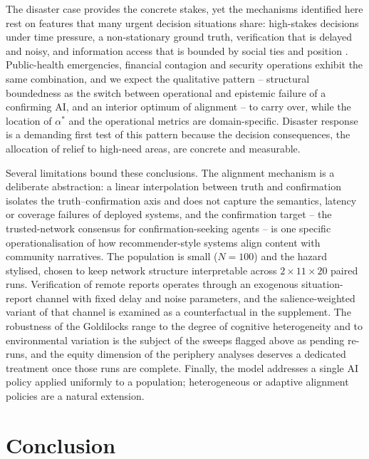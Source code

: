 \documentclass[pdflatex,sn-basic]{sn-jnl}
\begin{document}
The disaster case provides the concrete stakes, yet the mechanisms identified here rest on features that many urgent decision situations share: high-stakes decisions under time pressure, a non-stationary ground truth, verification that is delayed and noisy, and information access that is bounded by social ties and position \citep{svenson1993time,mendonca2001decision,holguin2012unique}. Public-health emergencies, financial contagion and security operations exhibit the same combination, and we expect the qualitative pattern -- structural boundedness as the switch between operational and epistemic failure of a confirming AI, and an interior optimum of alignment -- to carry over, while the location of $\alpha^{*}$ and the operational metrics are domain-specific. Disaster response is a demanding first test of this pattern because the decision consequences, the allocation of relief to high-need areas, are concrete and measurable.

Several limitations bound these conclusions. The alignment mechanism is a deliberate abstraction: a linear interpolation between truth and confirmation isolates the truth--confirmation axis and does not capture the semantics, latency or coverage failures of deployed systems, and the confirmation target -- the trusted-network consensus for confirmation-seeking agents -- is one specific operationalisation of how recommender-style systems align content with community narratives. The population is small ($N = 100$) and the hazard stylised, chosen to keep network structure interpretable across $2 \times 11 \times 20$ paired runs. Verification of remote reports operates through an exogenous situation-report channel with fixed delay and noise parameters, and the salience-weighted variant of that channel is examined as a counterfactual in the supplement. The robustness of the Goldilocks range to the degree of cognitive heterogeneity and to environmental variation is the subject of the sweeps flagged above as pending re-runs, and the equity dimension of the periphery analyses deserves a dedicated treatment once those runs are complete. Finally, the model addresses a single AI policy applied uniformly to a population; heterogeneous or adaptive alignment policies are a natural extension.

\section{Conclusion}\label{sec:conclusion}
\end{document}
